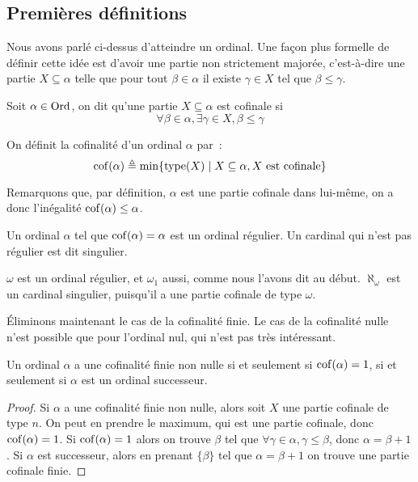\subsection{Premières définitions}

Nous avons parlé ci-dessus d'atteindre un ordinal. Une façon plus formelle de
définir cette idée est d'avoir une partie non strictement majorée, c'est-à-dire
une partie $X\subseteq \alpha$ telle que pour tout $\beta \in \alpha$ il existe
$\gamma \in X$ tel que $\beta \leq \gamma$.

\begin{definition}[Cofinalité]
  Soit $\alpha\in\operatorname{Ord}$, on dit qu'une partie $X\subseteq \alpha$ est cofinale si
  \[\forall \beta \in \alpha, \exists \gamma \in X, \beta \leq \gamma\]

  On définit la cofinalité d'un ordinal $\alpha$ par~:
  \[\operatorname{cof}(\alpha) \triangleq \min \{\operatorname{type}(X)
  \mid X\subseteq\alpha, X\text{ est cofinale}\}\]
\end{definition}

Remarquons que, par définition, $\alpha$ est une partie cofinale dans lui-même,
on a donc l'inégalité $\operatorname{cof}(\alpha) \leq \alpha$.

\begin{definition}
  Un ordinal $\alpha$ tel que $\operatorname{cof}(\alpha) = \alpha$ est un ordinal régulier.
  Un cardinal qui n'est pas régulier est dit singulier.
\end{definition}

\begin{example}
  $\omega$ est un ordinal régulier, et $\omega_1$ aussi, comme nous l'avons dit
  au début. $\aleph_\omega$ est un cardinal singulier, puisqu'il a une partie
  cofinale de type $\omega$.
\end{example}

\'Eliminons maintenant le cas de la cofinalité finie. Le cas de la cofinalité
nulle n'est possible que pour l'ordinal nul, qui n'est pas très intéressant.

\begin{proposition}
  Un ordinal $\alpha$ a une cofinalité finie non nulle si et seulement si
  $\operatorname{cof}(\alpha) = 1$, si et seulement si $\alpha$ est un ordinal successeur.
\end{proposition}

\begin{proof}
  Si $\alpha$ a une cofinalité finie non nulle, alors soit $X$ une partie
  cofinale de type $n$. On peut en prendre le maximum, qui est une partie
  cofinale, donc $\operatorname{cof}(\alpha) = 1$. Si $\operatorname{cof}(\alpha) = 1$ alors on trouve
  $\beta$ tel que $\forall \gamma \in \alpha, \gamma \leq \beta$, donc
  $\alpha = \beta + 1$. Si $\alpha$ est successeur, alors en prenant $\{\beta\}$
  tel que $\alpha = \beta + 1$ on trouve une partie cofinale finie.
\end{proof}

